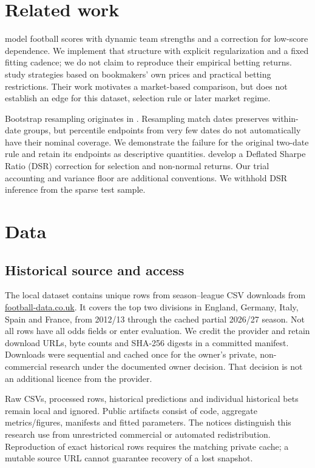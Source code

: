 \documentclass[11pt]{article}
\begin{document}
\section{Related work}
\citet{dixon1997} model football scores with dynamic team strengths and a correction for
low-score dependence. We implement that structure with explicit regularization and a
fixed fitting cadence; we do not claim to reproduce their empirical betting returns.
\citet{kaunitz2017} study strategies based on bookmakers' own prices and practical betting
restrictions. Their work motivates a market-based comparison, but does not establish an
edge for this dataset, selection rule or later market regime.

Bootstrap resampling originates in \citet{efron1979}. Resampling match dates preserves
within-date groups, but percentile endpoints from very few dates do not automatically
have their nominal coverage. We demonstrate the failure for the original two-date rule
and retain its endpoints as descriptive quantities. \citet{bailey2014} develop a Deflated
Sharpe Ratio (DSR) correction for selection and non-normal returns. Our trial accounting and variance floor are additional conventions. We withhold DSR
inference from the sparse test sample.

\section{Data}
\subsection{Historical source and access}
The local dataset contains \researchRows{} unique rows from \rawFiles{} season--league
CSV downloads from \href{https://football-data.co.uk/}{football-data.co.uk}. It covers the
top two divisions in England, Germany, Italy, Spain and France, from 2012/13 through the
cached partial 2026/27 season. Not all rows have all odds fields or enter evaluation.
We credit the provider and retain download URLs, byte counts and SHA-256 digests in a
committed manifest. Downloads were sequential and cached once for the owner's private,
non-commercial research under the documented owner decision. That decision is not an
additional licence from the provider.

Raw CSVs, processed rows, historical predictions and individual historical bets remain
local and ignored. Public artifacts consist of code, aggregate metrics/figures, manifests
and fitted parameters. The notices distinguish this research use from unrestricted
commercial or automated redistribution. Reproduction of exact historical rows requires
the matching private cache; a mutable source URL cannot guarantee recovery of a lost snapshot.
\end{document}
